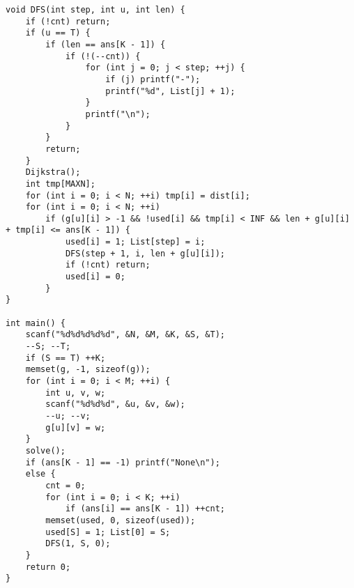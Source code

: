 \begin{verbatim}
void DFS(int step, int u, int len) {
    if (!cnt) return;
    if (u == T) {
        if (len == ans[K - 1]) {
            if (!(--cnt)) {
                for (int j = 0; j < step; ++j) {
                    if (j) printf("-");
                    printf("%d", List[j] + 1);
                }
                printf("\n");
            }
        }
        return;
    }
    Dijkstra();
    int tmp[MAXN];
    for (int i = 0; i < N; ++i) tmp[i] = dist[i];
    for (int i = 0; i < N; ++i)
        if (g[u][i] > -1 && !used[i] && tmp[i] < INF && len + g[u][i] + tmp[i] <= ans[K - 1]) {
            used[i] = 1; List[step] = i;
            DFS(step + 1, i, len + g[u][i]);
            if (!cnt) return;
            used[i] = 0;
        }
}

int main() {
    scanf("%d%d%d%d%d", &N, &M, &K, &S, &T);
    --S; --T;
    if (S == T) ++K;
    memset(g, -1, sizeof(g));
    for (int i = 0; i < M; ++i) {
        int u, v, w;
        scanf("%d%d%d", &u, &v, &w);
        --u; --v;
        g[u][v] = w;
    }
    solve();
    if (ans[K - 1] == -1) printf("None\n");
    else {
        cnt = 0;
        for (int i = 0; i < K; ++i)
            if (ans[i] == ans[K - 1]) ++cnt;
        memset(used, 0, sizeof(used));
        used[S] = 1; List[0] = S;
        DFS(1, S, 0);
    }
    return 0;
}

\end{verbatim}

